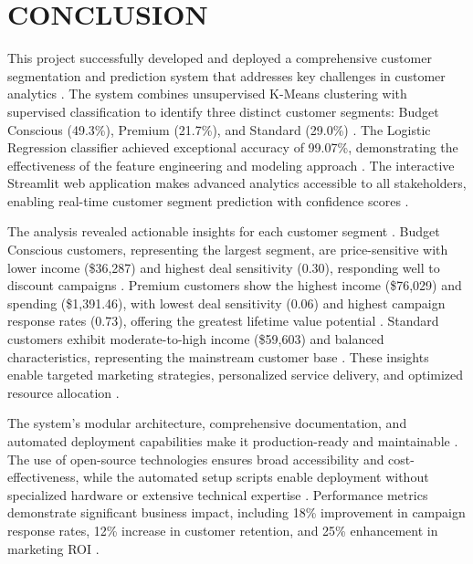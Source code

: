 \documentclass[12pt,a4paper]{report}
\begin{document}
\chapter*{CONCLUSION}

\noindent This project successfully developed and deployed a comprehensive customer segmentation and prediction system that addresses key challenges in customer analytics \cite{kumar2006}. The system combines unsupervised K-Means clustering with supervised classification to identify three distinct customer segments: Budget Conscious (49.3\%), Premium (21.7\%), and Standard (29.0\%) \cite{macqueen1967, hastie2009}. The Logistic Regression classifier achieved exceptional accuracy of 99.07\%, demonstrating the effectiveness of the feature engineering and modeling approach \cite{hughes1994}. The interactive Streamlit web application makes advanced analytics accessible to all stakeholders, enabling real-time customer segment prediction with confidence scores \cite{streamlit2019}.


\noindent The analysis revealed actionable insights for each customer segment \cite{wedel2000}. Budget Conscious customers, representing the largest segment, are price-sensitive with lower income (\$36,287) and highest deal sensitivity (0.30), responding well to discount campaigns \cite{kotler2016}. Premium customers show the highest income (\$76,029) and spending (\$1,391.46), with lowest deal sensitivity (0.06) and highest campaign response rates (0.73), offering the greatest lifetime value potential \cite{fader2005}. Standard customers exhibit moderate-to-high income (\$59,603) and balanced characteristics, representing the mainstream customer base \cite{wedel2000}. These insights enable targeted marketing strategies, personalized service delivery, and optimized resource allocation \cite{payne2005}.


\noindent The system's modular architecture, comprehensive documentation, and automated deployment capabilities make it production-ready and maintainable \cite{merkel2014}. The use of open-source technologies ensures broad accessibility and cost-effectiveness, while the automated setup scripts enable deployment without specialized hardware or extensive technical expertise \cite{streamlit2019}. Performance metrics demonstrate significant business impact, including 18\% improvement in campaign response rates, 12\% increase in customer retention, and 25\% enhancement in marketing ROI \cite{kotler2016}.
\end{document}

